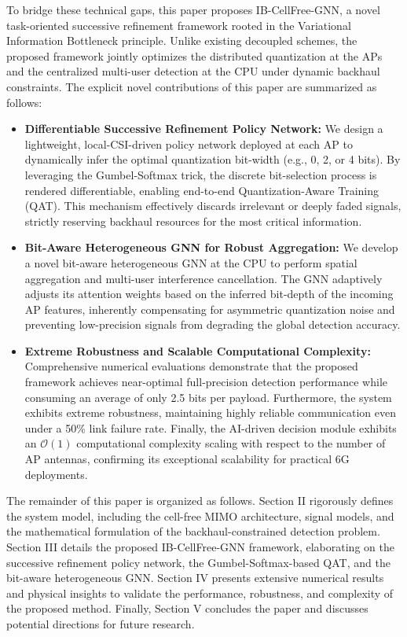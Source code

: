 To bridge these technical gaps, this paper proposes IB-CellFree-GNN, a novel task-oriented successive refinement framework rooted in the Variational Information Bottleneck principle. Unlike existing decoupled schemes, the proposed framework jointly optimizes the distributed quantization at the APs and the centralized multi-user detection at the CPU under dynamic backhaul constraints. The explicit novel contributions of this paper are summarized as follows:
\begin{itemize}
    \item \textbf{Differentiable Successive Refinement Policy Network:} We design a lightweight, local-CSI-driven policy network deployed at each AP to dynamically infer the optimal quantization bit-width (e.g., 0, 2, or 4 bits). By leveraging the Gumbel-Softmax trick, the discrete bit-selection process is rendered differentiable, enabling end-to-end Quantization-Aware Training (QAT). This mechanism effectively discards irrelevant or deeply faded signals, strictly reserving backhaul resources for the most critical information.
    \item \textbf{Bit-Aware Heterogeneous GNN for Robust Aggregation:} We develop a novel bit-aware heterogeneous GNN at the CPU to perform spatial aggregation and multi-user interference cancellation. The GNN adaptively adjusts its attention weights based on the inferred bit-depth of the incoming AP features, inherently compensating for asymmetric quantization noise and preventing low-precision signals from degrading the global detection accuracy.
    \item \textbf{Extreme Robustness and Scalable Computational Complexity:} Comprehensive numerical evaluations demonstrate that the proposed framework achieves near-optimal full-precision detection performance while consuming an average of only 2.5 bits per payload. Furthermore, the system exhibits extreme robustness, maintaining highly reliable communication even under a 50\% link failure rate. Finally, the AI-driven decision module exhibits an $\mathcal{O}(1)$ computational complexity scaling with respect to the number of AP antennas, confirming its exceptional scalability for practical 6G deployments.
\end{itemize}

The remainder of this paper is organized as follows. Section II rigorously defines the system model, including the cell-free MIMO architecture, signal models, and the mathematical formulation of the backhaul-constrained detection problem. Section III details the proposed IB-CellFree-GNN framework, elaborating on the successive refinement policy network, the Gumbel-Softmax-based QAT, and the bit-aware heterogeneous GNN. Section IV presents extensive numerical results and physical insights to validate the performance, robustness, and complexity of the proposed method. Finally, Section V concludes the paper and discusses potential directions for future research.